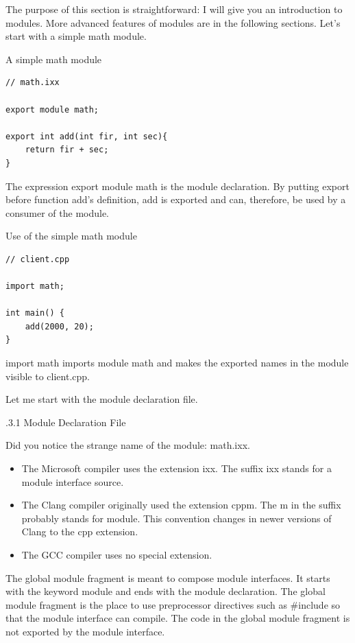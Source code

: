 
The purpose of this section is straightforward: I will give you an introduction to modules. More advanced features of modules are in the following sections. Let’s start with a simple math module.

\noindent
A simple math module
\begin{lstlisting}[style=styleCXX]
// math.ixx

export module math;

export int add(int fir, int sec){
	return fir + sec;
}
\end{lstlisting}

The expression export module math is the module declaration. By putting export before function add’s definition, add is exported and can, therefore, be used by a consumer of the module.

\noindent
Use of the simple math module
\begin{lstlisting}[style=styleCXX]
// client.cpp

import math;

int main() {
	add(2000, 20);
}
\end{lstlisting}

import math imports module math and makes the exported names in the module visible to client.cpp.

Let me start with the module declaration file.

.3.1\hspace{0.2cm} Module Declaration File

Did you notice the strange name of the module: math.ixx.

\begin{itemize}
\item 
The Microsoft compiler uses the extension ixx. The suffix ixx stands for a module interface source.

\item 
The Clang compiler originally used the extension cppm. The m in the suffix probably stands for module. This convention changes in newer versions of Clang to the cpp extension.

\item 
The GCC compiler uses no special extension.
\end{itemize}

The global module fragment is meant to compose module interfaces. It starts with the keyword module and ends with the module declaration. The global module fragment is the place to use preprocessor directives such as \#include so that the module interface can compile. The code in the global module fragment is not exported by the module interface.

